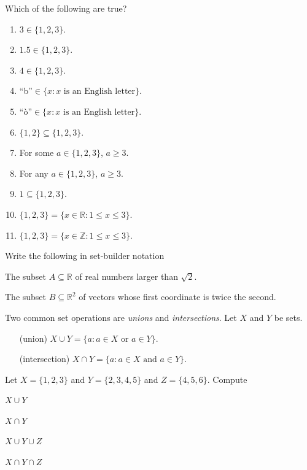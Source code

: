 \documentclass[14pt]{problemset}
\newcommand{\R}{\mathbb{R}}
\newcommand{\Z}{\mathbb{Z}}
\begin{document}
	\question
	\begin{parts}
		\item Which of the following are true?
		\begin{enumerate}
			\item $3\in\{1,2,3\}$.
			\item $1.5\in\{1,2,3\}$.
			\item $4\in\{1,2,3\}$.
			\item ``b''$\in\{x:x\text{ is an English letter}\}$.
			\item ``\`o''$\in\{x:x\text{ is an English letter}\}$.
			\item $\{1,2\}\subseteq \{1,2,3\}$.
			\item For some $a\in\{1,2,3\}$, $a \geq 3$.
			\item For any $a\in\{1,2,3\}$, $a\geq 3$.
			\item $1\subseteq\{1,2,3\}$.
			\item $\{1,2,3\}=\{x\in\R:1\leq x\leq 3\}$.
			\item $\{1,2,3\}=\{x\in\Z:1\leq x\leq 3\}$.
		\end{enumerate}
	\end{parts}

	\question
		Write the following in set-builder notation
	\begin{parts}
			\item The subset $A\subseteq \R$ of real numbers larger than $\sqrt{2}$.
			\item The subset $B\subseteq \R^2$ of vectors whose first coordinate
			is twice the second.
	\end{parts}

	\begin{definition}
		Two common set operations are \emph{unions} and \emph{intersections}.  
		Let $X$ and $Y$ be sets.

		\hfill\begin{minipage}{\dimexpr\textwidth-3cm}
		\begin{itemize}
			\item[(union)] $X\cup Y = \{a:a\in X\text{ or }a\in Y\}$.
			\item[(intersection)] $X\cap Y = \{a: a\in X\text{ and }a\in Y\}$.
		\end{itemize}
		\end{minipage}
	\end{definition}

	\question
	Let $X=\{1,2,3\}$ and $Y=\{2,3,4,5\}$ and $Z=\{4,5,6\}$.  Compute
	\begin{parts}
		\item $X\cup Y$
		\item $X\cap Y$
		\item $X\cup Y\cup Z$
		\item $X\cap Y\cap Z$
	\end{parts}
\end{document}
